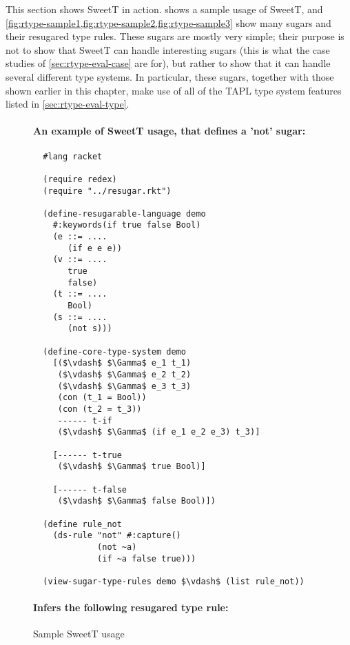 This section shows SweetT in action.  shows a sample
usage of SweetT, and \cref{fig:rtype-sample1,fig:rtype-sample2,fig:rtype-sample3} show
many sugars and their resugared type rules. These sugars are mostly
very simple; their purpose is not to show that SweetT can handle
interesting sugars (this is what the case studies of
\cref{sec:rtype-eval-case} are for), but rather to show that it can handle
several different type systems. In particular, these sugars, together
with those shown earlier in this chapter, make use of all of the TAPL type
system features listed in \cref{sec:rtype-eval-type}.
\begin{figure*}[h]
\paragraph{An example of SweetT usage, that defines a 'not' sugar:}
\begin{lstlisting}
  #lang racket

  (require redex)
  (require "../resugar.rkt")
  
  (define-resugarable-language demo
    #:keywords(if true false Bool)
    (e ::= ....
       (if e e e))
    (v ::= ....
       true
       false)
    (t ::= ....
       Bool)
    (s ::= ....
       (not s)))
  
  (define-core-type-system demo
    [($\vdash$ $\Gamma$ e_1 t_1)
     ($\vdash$ $\Gamma$ e_2 t_2)
     ($\vdash$ $\Gamma$ e_3 t_3)
     (con (t_1 = Bool))
     (con (t_2 = t_3))
     ------ t-if
     ($\vdash$ $\Gamma$ (if e_1 e_2 e_3) t_3)]
  
    [------ t-true
     ($\vdash$ $\Gamma$ true Bool)]
  
    [------ t-false
     ($\vdash$ $\Gamma$ false Bool)])
  
  (define rule_not
    (ds-rule "not" #:capture()
             (not ~a)
             (if ~a false true)))
  
  (view-sugar-type-rules demo $\vdash$ (list rule_not))
\end{lstlisting}
\paragraph{Infers the following resugared type rule:}

\caption{Sample SweetT usage}\label{fig:rtype-demo}
\end{figure*}


